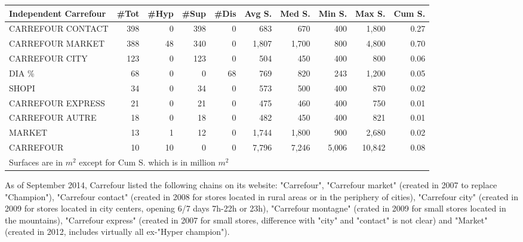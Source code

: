 \documentclass[11pt]{article}
\begin{document}
\begin{table}[H]
\footnotesize
\setlength{\tabcolsep}{2pt}

\begin{tabular}{lrrrrrrrrr}
\toprule
\toprule
Independent Carrefour &       \#Tot &       \#Hyp &       \#Sup &       \#Dis &     Avg S. &     Med S. &     Min S. &     Max S. &     Cum S. \\
\midrule
CARREFOUR CONTACT &        398 &          0 &        398 &          0 &        683 &        670 &        400 &      1,800 &       0.27 \\
CARREFOUR MARKET  &        388 &         48 &        340 &          0 &      1,807 &      1,700 &        800 &      4,800 &       0.70 \\
CARREFOUR CITY    &        123 &          0 &        123 &          0 &        504 &        450 &        400 &        800 &       0.06 \\
DIA \%             &         68 &          0 &          0 &         68 &        769 &        820 &        243 &      1,200 &       0.05 \\
SHOPI             &         34 &          0 &         34 &          0 &        573 &        500 &        400 &        870 &       0.02 \\
CARREFOUR EXPRESS &         21 &          0 &         21 &          0 &        475 &        460 &        400 &        750 &       0.01 \\
CARREFOUR AUTRE   &         18 &          0 &         18 &          0 &        482 &        450 &        400 &        821 &       0.01 \\
MARKET            &         13 &          1 &         12 &          0 &      1,744 &      1,800 &        900 &      2,680 &       0.02 \\
CARREFOUR         &         10 &         10 &          0 &          0 &      7,796 &      7,246 &      5,006 &     10,842 &       0.08 \\
\bottomrule
\multicolumn{10}{l}{\footnotesize Surfaces are in $m^2$ except for Cum S. which is in million $m^2$} \\
\end{tabular}

\end{table}

As of September 2014, Carrefour listed the following chains on its website: "Carrefour", "Carrefour market" (created in 2007 to replace "Champion"), "Carrefour contact" (created in 2008 for stores located in rural areas or in the periphery of cities), "Carrefour city" (created in 2009 for stores located in city centers, opening 6/7 days 7h-22h or 23h), "Carrefour montagne" (crated in 2009 for small stores located in the mountains), "Carrefour express" (created in 2007 for small stores, difference with "city" and "contact" is not clear) and "Market" (created in 2012, includes virtually all ex-"Hyper champion").
\end{document}
